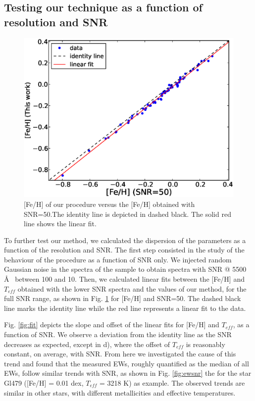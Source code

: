 \documentclass{aa}
\begin{document}
\subsection{Testing our technique as a function of resolution and SNR}
\label{sec:testcal}

\begin{figure}[]
\begin{center}
\includegraphics[scale=0.40]{pics/fehfehsnr.eps}
\end{center}
\caption{[Fe/H] of our procedure versus the [Fe/H] obtained with SNR=50.The identity line is depicted in dashed black. The solid red line shows the linear fit.}
\label{fig:fehfehsnr}
\end{figure}



To further test our method, we calculated the dispersion of the parameters as a function of the resolution and SNR. The first step consisted in the study of the behaviour of the procedure as a function of SNR only. We injected random Gaussian noise in the spectra of the sample to obtain spectra with SNR @ 5500 \AA~ between 100 and 10. Then, we calculated linear fits between the [Fe/H] and $T_{eff}$ obtained with the lower SNR spectra and the values of our method, for the full SNR range, as shown in Fig. \ref{fig:fehfehsnr} for [Fe/H] and SNR=50. The dashed black line marks the identity line while the red line represents a linear fit to the data. 



Fig. \ref{fig:fit} depicts the slope and offset of the linear fits for [Fe/H] and $T_{eff}$, as a function of SNR. We observe a deviation from the identity line as the SNR decreases as expected, except in d), where the offset of $T_{eff}$ is reasonably constant, on average, with SNR. From here we investigated the cause of this trend and found that the measured EWs, roughly quantified as the median of all EWs, follow similar trends with SNR, as shown in Fig. \ref{fig:ewsnr} the for the star Gl479 ([Fe/H] = 0.01 dex, $T_{eff}$ = 3218 K) as example. The observed trends are similar in other stars, with different metallicities and effective temperatures.
\end{document}
